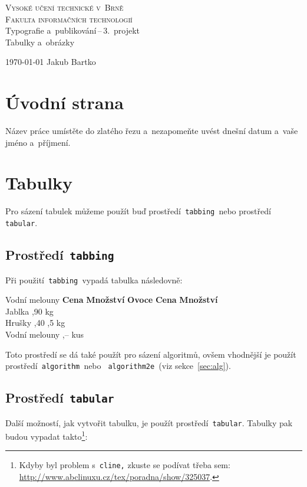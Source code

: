 \documentclass[a4paper, 11pt]{article}
\begin{document}
\begin{titlepage}
    \begin{center}
        \Huge
        \textsc{Vysoké učení technické v~Brně} \\
        \huge
        \textsc{Fakulta informačních technologií} \\
        \LARGE
        Typografie a~publikování\,--\,3.~projekt \\
        \Huge
        Tabulky a~obrázky\\
    \end{center}
    {\Large
        \today\hfill
        Jakub Bartko
    }
\end{titlepage}

\section{Úvodní strana}
Název práce umístěte do zlatého řezu a~nezapomeňte uvést dnešní datum a~vaše jméno a~příjmení.

\section{Tabulky}
Pro sázení tabulek můžeme použít buď prostředí\texttt{ tabbing }nebo prostředí\texttt{ tabular}.

\subsection{Prostředí\texttt{ tabbing}}
Při použití\texttt{ tabbing }vypadá tabulka následovně:
\begin{tabbing}
  Vodní melouny \quad \=\textbf{Cena} \quad \= \textbf{Množství}  \quad  \kill
  \textbf{Ovoce}    \> \textbf{Cena}    \> \textbf{Množství}  \\
  Jablka            ,90             kg     \\
  Hrušky            ,40            ,5 kg   \\
  Vodní melouny     ,--              kus    \\
\end{tabbing}
Toto prostředí se dá také použít pro sázení algoritmů, ovšem vhodnější je použít prostředí\texttt{ algorithm }nebo \texttt{ algorithm2e }(viz sekce~\ref{sec:alg}). 

\subsection{Prostředí\texttt{ tabular}}
Další možností, jak vytvořit tabulku, je použít prostředí\texttt{ tabular}. Tabulky pak budou vypadat takto\footnote{Kdyby byl problem s\texttt{~cline,} zkuste se podívat  třeba sem: \href{http://www.abclinuxu.cz/tex/poradna/show/325037}{http://www.abclinuxu.cz/tex/poradna/show/325037}.}: \\
\end{document}
